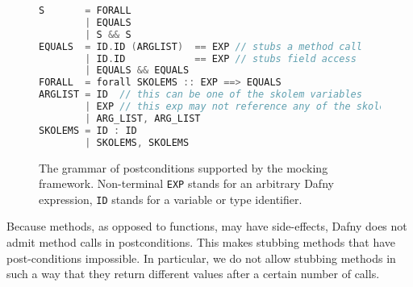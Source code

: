 \documentclass[runningheads]{llncs}
\begin{document}
\begin{figure}[h]
\begin{lstlisting}[language=c,basicstyle=\ttfamily\footnotesize]
S       = FORALL 
        | EQUALS 
        | S && S
EQUALS  = ID.ID (ARGLIST)  == EXP // stubs a method call
        | ID.ID            == EXP // stubs field access
        | EQUALS && EQUALS
FORALL  = forall SKOLEMS :: EXP ==> EQUALS
ARGLIST = ID  // this can be one of the skolem variables
        | EXP // this exp may not reference any of the skolems 
        | ARG_LIST, ARG_LIST
SKOLEMS = ID : ID 
        | SKOLEMS, SKOLEMS
\end{lstlisting}
\caption{The grammar of postconditions supported by the mocking framework. Non-terminal \texttt{EXP} stands for an arbitrary Dafny expression, \texttt{ID} stands for a variable or type identifier.}
\label{grammar}
\end{figure}

Because methods, as opposed to functions, may have side-effects, Dafny does not admit method calls in postconditions. 
This makes stubbing methods that have post-conditions impossible.
In particular, we do not allow stubbing methods in such a way that they return different values after a certain number of calls. 
\end{document}
